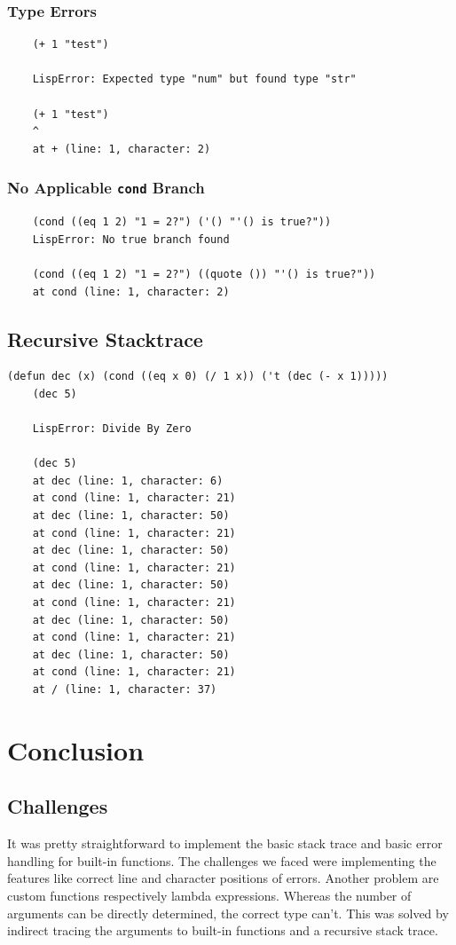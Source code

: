 \documentclass[a4paper,titlepage]{article}
\numberwithin{equation}{section} %
\begin{document}
	\subsubsection{Type Errors}
	\begin{lstlisting}
	(+ 1 "test")
	
	LispError: Expected type "num" but found type "str"
	
	(+ 1 "test")
	^
	at + (line: 1, character: 2)
	\end{lstlisting}
	\vspace{1cm}
	
	\subsubsection{No Applicable \texttt{cond} Branch}
	\begin{lstlisting}
	(cond ((eq 1 2) "1 = 2?") ('() "'() is true?"))
	LispError: No true branch found
	
	(cond ((eq 1 2) "1 = 2?") ((quote ()) "'() is true?"))
	at cond (line: 1, character: 2)
	\end{lstlisting}
	
	
	\newpage
	\subsection{Recursive Stacktrace}
	\begin{lstlisting}[]
	(defun dec (x) (cond ((eq x 0) (/ 1 x)) ('t (dec (- x 1)))))
	(dec 5)
	
	LispError: Divide By Zero
	
	(dec 5)
	at dec (line: 1, character: 6)
	at cond (line: 1, character: 21)
	at dec (line: 1, character: 50)
	at cond (line: 1, character: 21)
	at dec (line: 1, character: 50)
	at cond (line: 1, character: 21)
	at dec (line: 1, character: 50)
	at cond (line: 1, character: 21)
	at dec (line: 1, character: 50)
	at cond (line: 1, character: 21)
	at dec (line: 1, character: 50)
	at cond (line: 1, character: 21)
	at / (line: 1, character: 37)
	\end{lstlisting}
	\newpage
	
	
	\section{Conclusion}
	\subsection{Challenges}
	It was pretty straightforward to implement the basic stack trace and basic error handling for built-in functions. The challenges we faced were implementing the features like correct line and character positions of errors. Another problem are custom functions respectively lambda expressions. Whereas the number of arguments can be directly determined, the correct type can't. This was solved by indirect tracing the arguments to built-in functions and a recursive stack trace.
	
\end{document}
